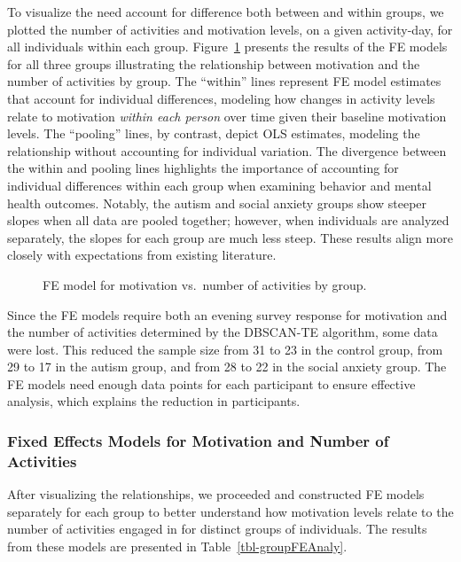 \documentclass[
  letterpaper,
  number,
  review,
  3p]{elsarticle}
\begin{document}
To visualize the need account for difference both between and within
groups, we plotted the number of activities and motivation levels, on a
given activity-day, for all individuals within each group.
Figure~\ref{fig-groupFE} presents the results of the FE models for all
three groups illustrating the relationship between motivation and the
number of activities by group. The ``within'' lines represent FE model
estimates that account for individual differences, modeling how changes
in activity levels relate to motivation \emph{within each person} over
time given their baseline motivation levels. The ``pooling'' lines, by
contrast, depict OLS estimates, modeling the relationship without
accounting for individual variation. The divergence between the within
and pooling lines highlights the importance of accounting for individual
differences within each group when examining behavior and mental health
outcomes. Notably, the autism and social anxiety groups show steeper
slopes when all data are pooled together; however, when individuals are
analyzed separately, the slopes for each group are much less steep.
These results align more closely with expectations from existing
literature.

\begin{figure}[H]


\caption{\label{fig-groupFE}FE model for motivation vs.~number of
activities by group.}

\end{figure}%

Since the FE models require both an evening survey response for
motivation and the number of activities determined by the DBSCAN-TE
algorithm, some data were lost. This reduced the sample size from 31 to
23 in the control group, from 29 to 17 in the autism group, and from 28
to 22 in the social anxiety group. The FE models need enough data points
for each participant to ensure effective analysis, which explains the
reduction in participants.

\subsubsection{Fixed Effects Models for Motivation and Number of
Activities}\label{fixed-effects-models-for-motivation-and-number-of-activities}

After visualizing the relationships, we proceeded and constructed FE
models separately for each group to better understand how motivation
levels relate to the number of activities engaged in for distinct groups
of individuals. The results from these models are presented in
Table~\ref{tbl-groupFEAnaly}.
\end{document}

